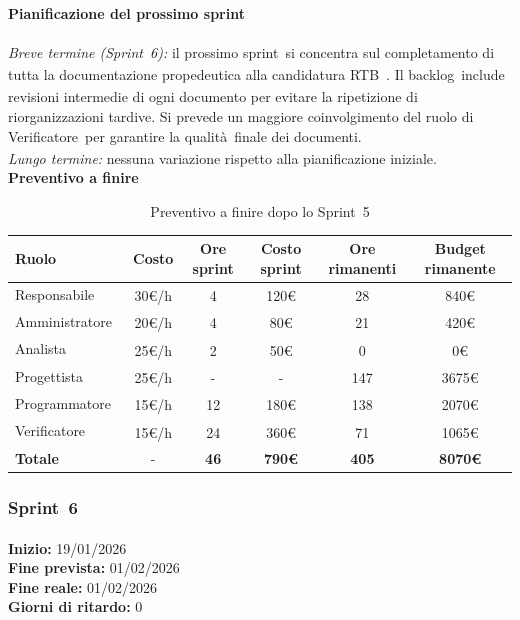 \documentclass[a4paper,12pt]{article}
\newcommand{\pediceG}{\texorpdfstring{\textsubscript{\scalebox{0.6}{\textbf{G}}}~}{G}}
\begin{document}
\noindent\textbf{Pianificazione del prossimo sprint}\\\\
\textit{Breve termine (Sprint\pediceG 6):} il prossimo sprint\pediceG si concentra sul completamento di tutta la documentazione propedeutica alla candidatura RTB\pediceG. Il backlog\pediceG include revisioni intermedie di ogni documento per evitare la ripetizione di riorganizzazioni tardive. Si prevede un maggiore coinvolgimento del ruolo di Verificatore\pediceG per garantire la qualità\pediceG finale dei documenti.\\

\textit{Lungo termine:} nessuna variazione rispetto alla pianificazione iniziale.\\
\newpage
\noindent\textbf{Preventivo a finire}

\begin{table}[H]
\centering
\footnotesize
\begin{tabular}{|l|c|c|c|c|c|}
\hline
Ruolo & Costo & Ore sprint & Costo sprint & Ore rimanenti & Budget rimanente \\
\hline
Responsabile\pediceG & 30€/h & 4 & 120€ & 28 & 840€ \\
\hline
Amministratore\pediceG & 20€/h & 4 & 80€ & 21 & 420€ \\
\hline
Analista\pediceG & 25€/h & 2 & 50€ & 0 & 0€ \\
\hline
Progettista\pediceG & 25€/h & - & - & 147 & 3675€ \\
\hline
Programmatore\pediceG & 15€/h & 12 & 180€ & 138 & 2070€ \\
\hline
Verificatore\pediceG & 15€/h & 24 & 360€ & 71 & 1065€ \\
\hline
\textbf{Totale} & - & \textbf{46} & \textbf{790€} & \textbf{405} & \textbf{8070€} \\
\hline
\end{tabular}
\caption{Preventivo a finire dopo lo Sprint\pediceG 5}
\label{tab:risorse-sprint5}
\end{table}

\newpage

\subsubsection{Sprint\pediceG 6}

\textbf{Inizio:} 19/01/2026 \\
\textbf{Fine prevista:} 01/02/2026 \\
\textbf{Fine reale:} 01/02/2026 \\
\textbf{Giorni di ritardo:} 0
\end{document}
